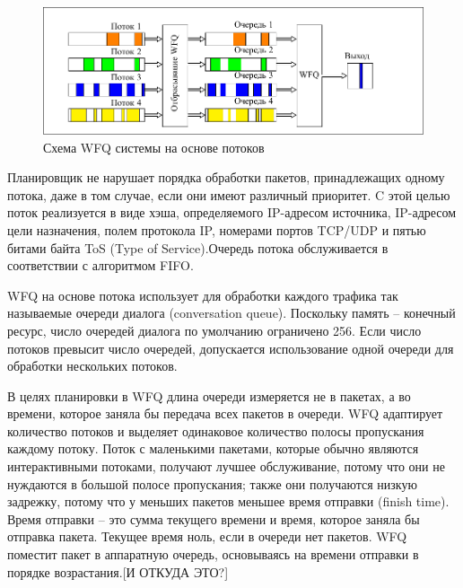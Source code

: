    
    \begin{figure}[ht!]
			\center
        \includegraphics{./pdfimages/fwfq.pdf}
        \caption{Схема WFQ системы на основе потоков}
    \end{figure}


    Планировщик не нарушает порядка обработки пакетов,
    принадлежащих одному потока, даже в том случае, если они имеют различный приоритет.
    C этой целью поток реализуется в виде хэша, определяемого IP-адресом источника,
    IP-адресом цели назначения, полем протокола IP, номерами портов TCP/UDP и пятью
    битами байта ToS (Type of Service).Очередь потока обслуживается в соответствии с алгоритмом FIFO.


    WFQ на основе потока использует для обработки каждого трафика так называемые
    очереди диалога (conversation queue).
    Поскольку память -- конечный ресурс, число очередей диалога по умолчанию
    ограничено 256. Если число потоков превысит число очередей, допускается
    использование одной очереди для обработки нескольких потоков.\cite{Vagesna}

    В целях планировки в WFQ длина очереди измеряется не в пакетах, а во времени,
    которое заняла бы передача всех пакетов в очереди. WFQ адаптирует количество
    потоков и выделяет одинаковое количество полосы пропускания каждому потоку.
    Поток с маленькими пакетами, которые обычно являются интерактивными потоками,
    получают лучшее обслуживание, потому что они не нуждаются в большой полосе пропускания;
    также они получаются низкую задрежку, потому что у меньших пакетов меньшее
    время отправки (finish time). Время отправки -- это сумма текущего времени и
    время, которое заняла бы отправка пакета. Текущее время ноль, если в очереди
    нет пакетов. WFQ поместит пакет в аппаратную очередь, основываясь на времени отправки в
    порядке возрастания.[И ОТКУДА ЭТО?]

